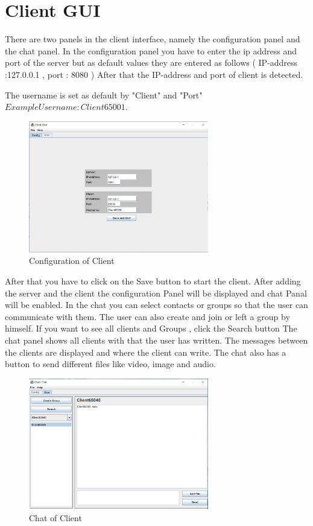 \section {Client GUI}\label{sec:client-gui}
There are two panels in the client interface, namely the configuration panel and the chat panel.
In the configuration panel you have to enter the ip address and port of the server but as default
values they are entered as follows ( IP-address :127.0.0.1 , port : 8080 ) After that the
IP-address and port of client is detected.
\medskip

\noindent
The username is set as default by "Client" and "Port" \( Example Username : Client65001\).
\begin{figure}
    \centering
    \includegraphics[width=0.7\textwidth]{gfx/client_config}
    \caption{Configuration of Client}
    \label{fig:Client-config}
\end{figure}
\noindent
After that you have to click on the Save button to start the client.
After adding the server and the client the configuration Panel will be displayed and chat Panal
will be enabled.
In the chat you can select contacts or groups so that the user can communicate with them.
The user can also create and join or left a group by himself.
If you want to see all clients and Groups , click the Search button
The chat panel shows all clients with that the user has written.
The messages between the clients are displayed and where the client can write.
The chat also has a button to send different files like video, image and audio.
\begin{figure}
    \centering
    \includegraphics[width=0.7\textwidth]{gfx/client_chat}
    \caption{Chat of Client}
    \label{fig:Client-Chat}
\end{figure}


